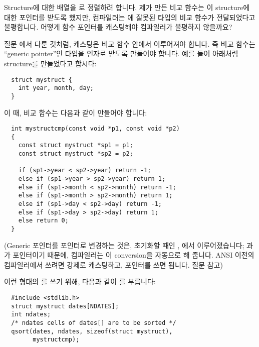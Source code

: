 \begin{faq}
	Structure에 대한 배열을 로 정렬하려 합니다.
        제가 만든 비교 함수는 이 structure에 대한 포인터를 받도록 했지만,
        컴파일러는 에 잘못된 타입의 비교 함수가 전달되었다고
        불평합니다. 어떻게 함수 포인터를 캐스팅해야 컴파일러가 불평하지
        않을까요?

\A
	질문 에서 다룬 것처럼, 캐스팅은 비교 함수 안에서 이루어져야
        합니다. 즉 비교 함수는 ``generic pointer''인  타입을
        인자로 받도록 만들어야 합니다. 예를 들어 아래처럼 structure를
        만들었다고 합시다:

\begin{verbatim}
  struct mystruct {
    int year, month, day;
  }
\end{verbatim}
	\noindent 이 때, 비교 함수는 다음과 같이 만들어야 합니다:

\begin{verbatim}
  int mystructcmp(const void *p1, const void *p2)
  {
    const struct mystruct *sp1 = p1;
    const struct mystruct *sp2 = p2;

    if (sp1->year < sp2->year) return -1;
    else if (sp1->year > sp2->year) return 1;
    else if (sp1->month < sp2->month) return -1;
    else if (sp1->month > sp2->month) return 1;
    else if (sp1->day < sp2->day) return -1;
    else if (sp1->day > sp2->day) return 1;
    else return 0;
  }
\end{verbatim}
	(Generic 포인터를  포인터로 변경하는 것은,
        초기화할 때인 , 에서 이루어졌습니다;
        과 가  포인터이기 때문에, 컴파일러는 이
        conversion을 자동으로 해 줍니다.  ANSI 이전의 컴파일러에서 쓰려면
        강제로 캐스팅하고,  포인터를 쓰면 됩니다.
        질문  참고)

	이런 형태의 를 쓰기 위해, 다음과 같이 를
        부릅니다:
\begin{verbatim}
  #include <stdlib.h>
  struct mystruct dates[NDATES];
  int ndates;
  /* ndates cells of dates[] are to be sorted */
  qsort(dates, ndates, sizeof(struct mystruct),
        mystructcmp);
\end{verbatim}


\end{faq}

